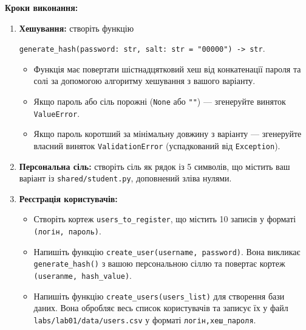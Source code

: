 \documentclass[12pt, a4paper]{article}
\begin{document}
\textbf{Кроки виконання:}
\begin{enumerate}
	\item \textbf{Хешування:} створіть функцію
	
	\verb|generate_hash(password: str, salt: str = "00000") -> str|.
		\begin{itemize}
			\item Функція має повертати шістнадцятковий хеш від конкатенації пароля та солі за допомогою алгоритму хешування з вашого варіанту.
			\item Якщо пароль або сіль порожні (\verb|None| або \verb|""|) --- згенеруйте виняток \verb|ValueError|.
			\item Якщо пароль коротший за мінімальну довжину з варіанту --- згенеруйте власний виняток \verb|ValidationError| (успадкований від \verb|Exception|).
		\end{itemize}
	\item \textbf{Персональна сіль:} створіть сіль як рядок із 5 символів, що містить ваш варіант із \verb|shared/student.py|, доповнений зліва нулями.
	\item \textbf{Реєстрація користувачів:}
		\begin{itemize}
			\item Створіть кортеж \verb|users_to_register|, що містить 10 записів у форматі \verb|(логін, пароль)|.
			\item Напишіть функцію \verb|create_user(username, password)|. Вона викликає \verb|generate_hash()| з вашою персональною сіллю та повертає кортеж \verb|(useranme, hash_value)|.
			\item Напишіть функцію \verb|create_users(users_list)| для створення бази даних. Вона обробляє весь список користувачів та записує їх у файл \verb|labs/lab01/data/users.csv| у форматі \verb|логін,хеш_пароля|.


\end{itemize}
\end{enumerate}
\end{document}
